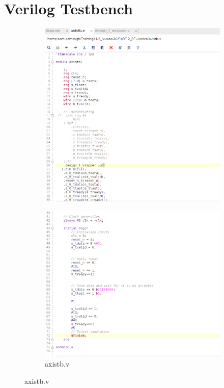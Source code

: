 \documentclass{article}
\begin{document}
\section{Verilog Testbench}
\begin{figure}[h]
\centering
\begin{subfigure}[b]{0.6\textwidth}
    \centering
\includegraphics[width=\textwidth]{figs/p2tbip1.png}
    \label{fig:my_label}
\end{subfigure}
\hfill
\begin{subfigure}[b]{0.6\textwidth}
    \centering
\includegraphics[width=\textwidth]{figs/p2tbip2.png}
    \caption{axistb.v}
    \label{fig:my_label}
\end{subfigure}
\end{figure}
\end{document}
